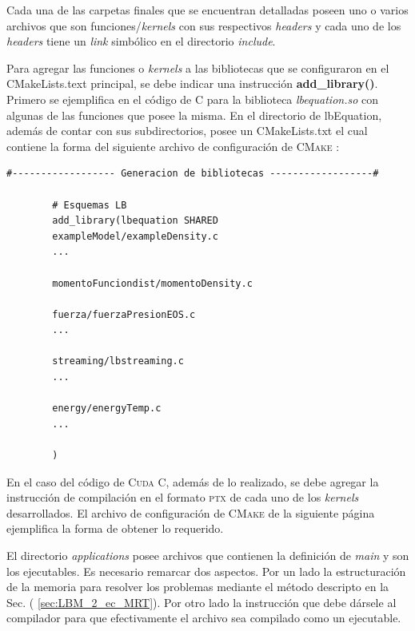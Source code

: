 \newpage

Cada una de las carpetas finales que se encuentran detalladas poseen uno o varios archivos que son funciones/\textit{kernels} con sus respectivos \textit{headers} y cada uno de los \textit{headers} tiene un \textit{link} simbólico en el directorio \textit{include}.

Para agregar las funciones o \textit{kernels} a las bibliotecas que se configuraron en el CMakeLists.text principal, se debe indicar una instrucción \textbf{add\_library()}. Primero se ejemplifica en el código de \textsc{C} para la biblioteca \textit{lbequation.so} con algunas de las funciones que posee la misma. En el directorio de lbEquation, además de contar con sus subdirectorios, posee un CMakeLists.txt el cual contiene la forma del siguiente archivo de configuración de \textsc{CMake} :

{\footnotesize
	\begin{frame}{}
		\begin{lstlisting}[frame=single]
#------------------ Generacion de bibliotecas ------------------#
		
		# Esquemas LB
		add_library(lbequation SHARED 
		exampleModel/exampleDensity.c
		...
		
		momentoFunciondist/momentoDensity.c
		
		fuerza/fuerzaPresionEOS.c
		...
		
		streaming/lbstreaming.c
		...
		
		energy/energyTemp.c
		...
		
		)
		\end{lstlisting}
		
	\end{frame}
}

En el caso del código de \textsc{Cuda C}, además de lo realizado, se debe agregar la instrucción de compilación en el formato \textsc{ptx} de cada uno de los \textit{kernels} desarrollados. El archivo de configuración de \textsc{CMake} de la siguiente página ejemplifica la forma de obtener lo requerido.

El directorio \textit{applications} posee archivos que contienen la definición de \textit{main} y son los ejecutables. Es necesario remarcar dos aspectos. Por un lado la estructuración de la memoria para resolver los problemas mediante el método descripto en la Sec. ( \ref{sec:LBM_2_ec_MRT}). Por otro lado la instrucción que debe dársele al compilador para que efectivamente el archivo sea compilado como un ejecutable.


